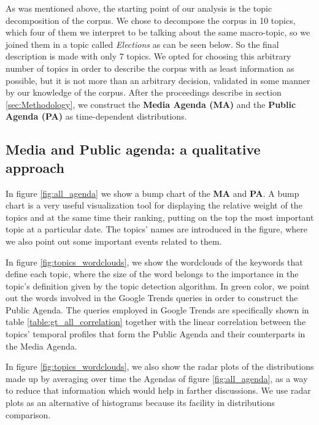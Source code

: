 
\par As was mentioned above, the starting point of our analysis is the topic decomposition of the corpus.
We chose to decompose the corpus in 10 topics, which four of them we interpret to be talking about the same macro-topic, so we joined them in a topic called \emph{Elections} as can be seen below. So the final description is made with only 7 topics.
We opted for choosing this arbitrary number of topics in order to describe the corpus with as least information as possible, but it is not more than an arbitrary decision, validated in some manner by our knowledge of the corpus.
After the proceedings describe in section \ref{sec:Methodology}, we construct the \textbf{Media Agenda (MA)} and the \textbf{Public Agenda (PA)} as time-dependent distributions. 

\subsection{Media and Public agenda: a qualitative approach}

\par In figure \ref{fig:all_agenda} we show a bump chart of the \textbf{MA} and \textbf{PA}. A bump chart is a very useful visualization tool for displaying the relative weight of the topics and at the same time their ranking, putting on the top the most important topic at a particular date. 
The topics' names are introduced in the figure, where we also point out some important events related to them.
\par In figure \ref{fig:topics_wordclouds}, we show the wordclouds of the keywords that define each topic, where the size of the word belongs to the importance in the topic's definition given by the topic detection algorithm. In green color, we point out the words involved in the Google Trends queries in order to construct the Public Agenda. The queries employed in Google Trends are specifically shown in table \ref{table:gt_all_correlation} together with the linear correlation between the topics' temporal profiles that form the Public Agenda and their counterparts in the Media Agenda.
\par In figure \ref{fig:topics_wordclouds}, we also show the radar plots of the distributions made up by averaging over time the Agendas of figure \ref{fig:all_agenda}, as a way to reduce that information which would help in farther discussions. We use radar plots as an alternative of histograms because its facility in distributions comparison.  

